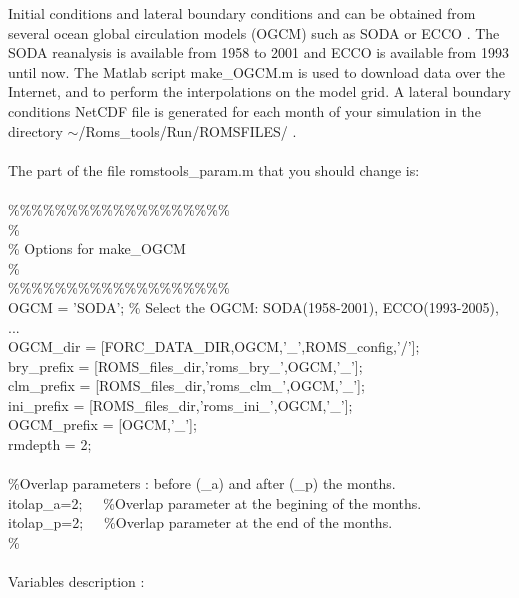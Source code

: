 Initial conditions and lateral boundary conditions and  can be 
obtained from several ocean global circulation models (OGCM) 
such as SODA \citep{Car05} or ECCO \citep{Sta99}. The SODA 
reanalysis is available from 1958 to 2001 and ECCO is available 
from 1993 until now. The Matlab script make\_OGCM.m is used to 
download data over the Internet, and to perform the interpolations 
on the model grid. 
A lateral boundary conditions NetCDF file is generated for each month 
of your simulation in the directory $\sim$/Roms\_tools/Run/ROMSFILES/ . 
\\
\\
The part of the file romstools\_param.m that you should change is:
\\
\\
\%\%\%\%\%\%\%\%\%\%\%\%\%\%\%\%\%\%\%\\
\%\\
\% Options for make\_OGCM \\
\%\\
\%\%\%\%\%\%\%\%\%\%\%\%\%\%\%\%\%\%\%\\
OGCM        = 'SODA';                                \% Select the OGCM:
SODA(1958-2001), ECCO(1993-2005), ...\\
OGCM\_dir    = [FORC\_DATA\_DIR,OGCM,'\_',ROMS\_config,'/'];  \\
bry\_prefix  = [ROMS\_files\_dir,'roms\_bry\_',OGCM,'\_']; \\
clm\_prefix  = [ROMS\_files\_dir,'roms\_clm\_',OGCM,'\_']; \\
ini\_prefix  = [ROMS\_files\_dir,'roms\_ini\_',OGCM,'\_']; \\
OGCM\_prefix = [OGCM,'\_'];                            \\
rmdepth     = 2;                                    \\ \\
\noindent \%Overlap parameters : before (\_a) and after (\_p) the months.\\ 
itolap\_a=2;~~~\%Overlap parameter at the begining of the months. \\ 
itolap\_p=2;~~~\%Overlap parameter at the end of the months. \\ 
\%                        \\
\\
Variables description :
